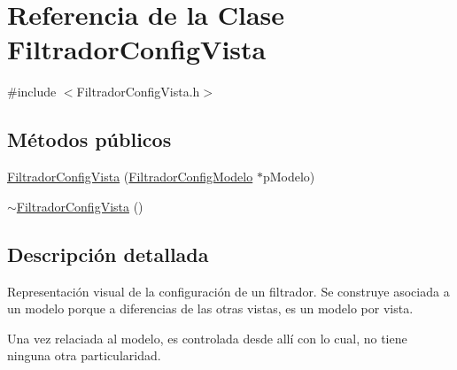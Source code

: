 \hypertarget{classFiltradorConfigVista}{\section{\-Referencia de la \-Clase \-Filtrador\-Config\-Vista}
\label{classFiltradorConfigVista}
}


{\ttfamily \#include $<$\-Filtrador\-Config\-Vista.\-h$>$}

\subsection*{\-Métodos públicos}
\begin{DoxyCompactItemize}
\item 
\hyperlink{classFiltradorConfigVista_a33a2ba1d24a4aa1980b89b0ab3c6e3b4}{\-Filtrador\-Config\-Vista} (\hyperlink{classFiltradorConfigModelo}{\-Filtrador\-Config\-Modelo} $\ast$p\-Modelo)
\item 
\hyperlink{classFiltradorConfigVista_a346460691c2ca8ee496eca47ed52928c}{$\sim$\-Filtrador\-Config\-Vista} ()
\end{DoxyCompactItemize}


\subsection{\-Descripción detallada}
\-Representación visual de la configuración de un filtrador. \-Se construye asociada a un modelo porque a diferencias de las otras vistas, es un modelo por vista.

\-Una vez relaciada al modelo, es controlada desde allí con lo cual, no tiene ninguna otra particularidad. 

